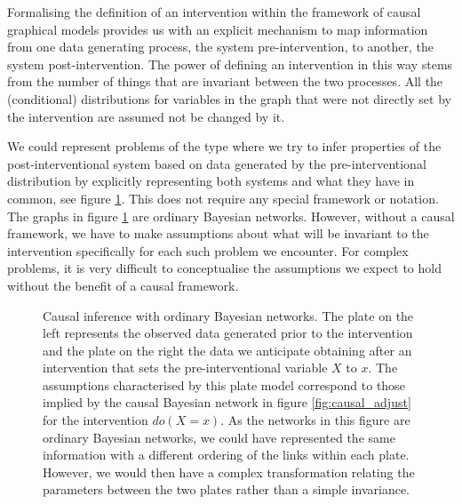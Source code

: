 \documentclass[11pt,a4paper,oneside]{book}
\theoremstyle{plain}
\theoremstyle{definition}
\begin{document}
Formalising the definition of an intervention within the framework of causal graphical models provides us with an explicit mechanism to map information from one data generating process, the system pre-intervention, to another, the system post-intervention. The power of defining an intervention in this way stems from the number of things that are invariant between the two processes. All the (conditional) distributions for variables in the graph that were not directly set by the intervention are assumed not be changed by it.  

We could represent problems of the type where we try to infer properties of the post-interventional system based on data generated by the pre-interventional distribution by explicitly representing both systems and what they have in common, see figure \ref{fig:causal_ordinary_bayes}. This does not require any special framework or notation. The graphs in figure  \ref{fig:causal_ordinary_bayes} are ordinary Bayesian networks. However, without a causal framework, we have to make assumptions about what will be invariant to the intervention specifically for each such problem we encounter. For complex problems, it is very difficult to conceptualise the assumptions we expect to hold without the benefit of a causal framework.  


\begin{figure}[h]
\center
{} 
\caption{Causal inference with ordinary Bayesian networks. The plate on the left represents the observed data generated prior to the intervention and the plate on the right the data we anticipate obtaining after an intervention that sets the pre-interventional variable $X$ to $x$. The assumptions characterised by this plate model correspond to those implied by the causal Bayesian network in figure \ref{fig:causal_adjust} for the intervention $do(X=x)$. As the networks in this figure are ordinary Bayesian networks, we could have represented the same information with a different ordering of the links within each plate. However, we would then have a complex transformation relating the parameters between the two plates rather than a simple invariance.}
\label{fig:causal_ordinary_bayes}
\end{figure}
\end{document}
